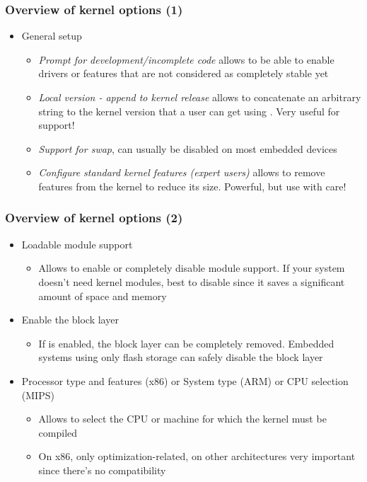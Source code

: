 \begin{frame}
  \frametitle{Overview of kernel options (1)}
  \begin{itemize}
  \item General setup
    \begin{itemize}
    \item {\em Prompt for development/incomplete code} allows to be
      able to enable drivers or features that are not considered as
      completely stable yet
    \item {\em Local version - append to kernel release} allows to
      concatenate an arbitrary string to the kernel version that a
      user can get using . Very useful for support!
    \item {\em Support for swap}, can usually be disabled on most
      embedded devices
    \item {\em Configure standard kernel features (expert users)}
      allows to remove features from the kernel to reduce its
      size. Powerful, but use with care!
    \end{itemize}
  \end{itemize}
\end{frame}

\begin{frame}
  \frametitle{Overview of kernel options (2)}
  \begin{itemize}
  \item Loadable module support
    \begin{itemize}
    \item Allows to enable or completely disable module support. If
      your system doesn't need kernel modules, best to disable since
      it saves a significant amount of space and memory
    \end{itemize}
  \item Enable the block layer
    \begin{itemize}
    \item If  is enabled, the block layer can be
      completely removed. Embedded systems using only flash storage
      can safely disable the block layer
    \end{itemize}
  \item Processor type and features (x86) or System type (ARM) or CPU selection
    (MIPS)
    \begin{itemize}
    \item Allows to select the CPU or machine for which the kernel
      must be compiled
    \item On x86, only optimization-related, on other architectures
      very important since there's no compatibility
    \end{itemize}
  \end{itemize}
\end{frame}

